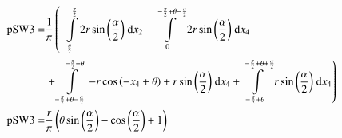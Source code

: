\begin{align}
    \mathrm{pSW3} =&\frac{1}{\pi} \left(\;\;\int\limits_{\frac{\theta}{2}}^{\frac{\pi}{2}}2 r \sin{\left (\frac{\alpha}{2} \right )}\;\mathrm{d}x_{2}+\int\limits_{0}^{- \frac{\pi}{2} + \theta - \frac{\alpha}{2}}2 r \sin{\left (\frac{\alpha}{2} \right )}\;\mathrm{d}x_{4}\right.\notag\\
 &\left.+\int\limits_{- \frac{\pi}{2} + \theta - \frac{\alpha}{2}}^{- \frac{\pi}{2} + \theta}- r \cos{\left (- x_{4} + \theta \right )} + r \sin{\left (\frac{\alpha}{2} \right )}\;\mathrm{d}x_{4}+\int\limits_{- \frac{\pi}{2} + \theta}^{- \frac{\pi}{2} + \theta + \frac{\alpha}{2}}r \sin{\left (\frac{\alpha}{2} \right )}\;\mathrm{d}x_{4}\right)\label{pSW3Def}\\
    \mathrm{pSW3} =& \frac{r}{\pi} \left(\theta \sin{\left (\frac{\alpha}{2} \right )} - \cos{\left (\frac{\alpha}{2} \right )} + 1\right)\label{pSW3Sln}
\end{align}